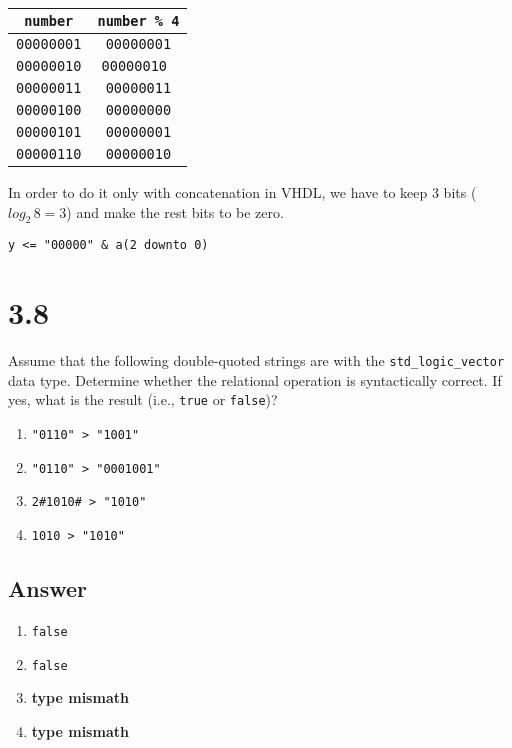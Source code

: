 \documentclass[dvipsnames, svgnames, x11names, a4paper,12pt]{article}
\begin{document}
\begin{table}[H]
\begin{center}
    \begin{tabular}{|c|c|}
        \hline
        \texttt{number} & \texttt{number \% 4} \\
        \hline
        \texttt{00000001} & \texttt{00000001} \\
        \hline
        \texttt{00000010} & \texttt{00000010 }\\
        \hline
        \texttt{00000011} & \texttt{00000011} \\
        \hline
        \texttt{00000100} & \texttt{00000000} \\
        \hline
        \texttt{00000101} & \texttt{00000001} \\
        \hline
        \texttt{00000110} & \texttt{00000010} \\
        \hline
    \end{tabular}
\end{center}
\end{table}

In order to do it only with concatenation in VHDL, we have to keep 3 bits ($log_2\, 8 = 3$) and make the rest bits to be zero.

\begin{lstlisting}
y <= "00000" & a(2 downto 0)
\end{lstlisting}

\section{3.8}    
 Assume that the following double-quoted strings are with the \texttt{std\_logic\_vector}
data type. Determine whether the relational operation is syntactically correct. If yes, what
is the result (i.e., \texttt{true} or \texttt{false})?

\begin{enumerate}[label=(\alph*)]
    \item \texttt{"0110" > "1001"}
    \item \texttt{"0110" > "0001001"}
    \item \texttt{2\#1010\# > "1010"}
    \item \texttt{1010 > "1010"}
\end{enumerate}
\subsection{Answer}

\begin{enumerate}[label=(\alph*)]
    \item \texttt{false}
    \item \texttt{false}
    \item \textbf{type mismath}
    \item \textbf{type mismath}
\end{enumerate}
\end{document}
